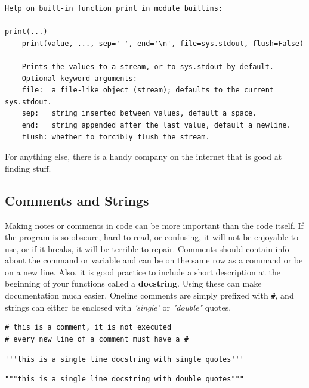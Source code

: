 \documentclass[%
oneside,                 %
final,                   %
10pt]{article}
\begin{document}
\begin{verbatim}
Help on built-in function print in module builtins:

print(...)
    print(value, ..., sep=' ', end='\n', file=sys.stdout, flush=False)

    Prints the values to a stream, or to sys.stdout by default.
    Optional keyword arguments:
    file:  a file-like object (stream); defaults to the current sys.stdout.
    sep:   string inserted between values, default a space.
    end:   string appended after the last value, default a newline.
    flush: whether to forcibly flush the stream.
\end{verbatim}

For anything else, there is a handy company on the internet that is good at finding stuff.


\subsection{Comments and Strings}

Making notes or comments in code can be more important than the code itself. If the program is so obscure, hard to read, or confusing, it will not be enjoyable to use, or if it breaks, it will be terrible to repair. Comments should contain info about the command or variable and  can be on the same row as a command or be on a new line. Also, it is good practice to include a short description at the beginning of your functions called a \textbf{docstring}. Using these can make documentation much easier. Oneline comments are simply prefixed with \Verb!#!, and strings can either be enclosed with \emph{'single'} or \emph{"double"} quotes.

\begin{verbatim}
# this is a comment, it is not executed
# every new line of a comment must have a #
\end{verbatim}

\begin{verbatim}
'''this is a single line docstring with single quotes'''
\end{verbatim}

\begin{verbatim}
"""this is a single line docstring with double quotes"""
\end{verbatim}
\end{document}
